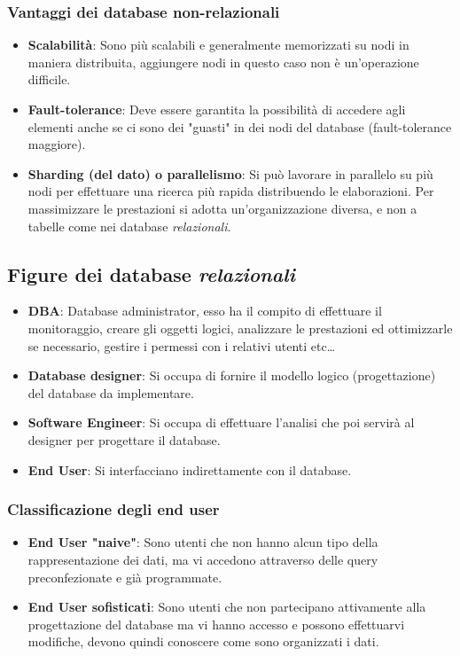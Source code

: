 \documentclass[a4paper,12pt]{report}
\begin{document}
\subsubsection{Vantaggi dei database non-relazionali}
\begin{itemize}
	\item \textbf{Scalabilità}: Sono più scalabili e generalmente memorizzati su nodi in maniera distribuita, aggiungere nodi in questo caso non è un'operazione difficile.
	\item \textbf{Fault-tolerance}: Deve essere garantita la possibilità di accedere agli elementi anche se ci sono dei "guasti" in dei nodi del database (fault-tolerance maggiore).
	\item \textbf{Sharding (del dato) o parallelismo}: Si può lavorare in parallelo su più nodi per effettuare una ricerca più rapida distribuendo le elaborazioni. Per massimizzare le prestazioni si adotta un'organizzazione diversa, e non a tabelle come nei database \textit{relazionali}.
\end{itemize}
  
\subsection{Figure dei database \textit{relazionali}}
\begin{itemize}
	\item \textbf{DBA}: Database administrator, esso ha il compito di effettuare il monitoraggio, creare gli oggetti logici, analizzare le prestazioni ed ottimizzarle se necessario, gestire i permessi con i relativi utenti etc\dots
	\item \textbf{Database designer}: Si occupa di fornire il modello logico (progettazione) del database da implementare.
	\item \textbf{Software Engineer}: Si occupa di effettuare l'analisi che poi servirà al designer per progettare il database.
	\item \textbf{End User}: Si interfacciano indirettamente con il database.
\end{itemize}
\subsubsection{Classificazione degli end user}
\begin{itemize}
	\item \textbf{End User "naive"}: Sono utenti che non hanno alcun tipo della rappresentazione dei dati, ma vi accedono attraverso delle query preconfezionate e già programmate.
	\item \textbf{End User sofisticati}: Sono utenti che non partecipano attivamente alla progettazione del database ma vi hanno accesso e possono effettuarvi modifiche, devono quindi conoscere come sono organizzati i dati.
\end{itemize}
\end{document}
